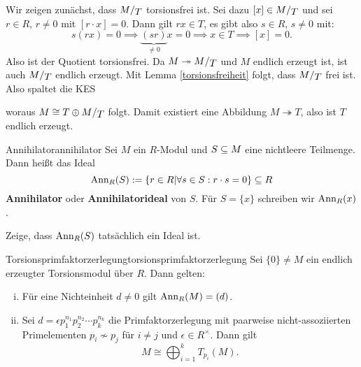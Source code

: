 \begin{beweis}
Wir zeigen zunächst, dass $\quotient{M}{T}$ torsionsfrei ist. Sei dazu $[x]\in \quotient{M}{T}$ und sei $r \in R$, $r \neq 0$ mit $[r \cdot x ] = 0$. Dann gilt $rx \in T$, es gibt also $s \in R$, $s \neq 0$ mit:
\begin{equation}
s(rx) = 0 \implies \underbrace{(sr)}_{\neq 0} x = 0 \implies x \in T \implies [x]=0.
\end{equation}
Also ist der Quotient torsionsfrei. Da $M \twoheadrightarrow \quotient{M}{T}$ und $M$ endlich erzeugt ist, ist auch $\quotient{M}{T}$ endlich erzeugt. Mit Lemma \ref{torsionsfreiheit} folgt, dass $\quotient{M}{T}$ frei ist. Also spaltet die KES
\begin{center}
\end{center}
woraus $M \cong T \oplus \quotient{M}{T}$ folgt. Damit existiert eine Abbildung $M \twoheadrightarrow T$, also ist $T$ endlich erzeugt. 
\end{beweis}
\begin{definition}{Annihilator}{annihilator}
Sei $M$ ein $R$-Modul und $S \subseteq M$ eine nichtleere Teilmenge. Dann heißt das Ideal
\begin{equation}
\operatorname{\text{Ann}}_R(S):=\{r \in R| \forall s \in S:r \cdot s =0\} \subseteq R
\end{equation}
\textbf{Annihilator} oder \textbf{Annihilatorideal} von $S$. Für $S=\{x\}$ schreiben wir $\operatorname{\text{Ann}}_R(x)$.
\end{definition}
\begin{übung}
Zeige, dass $\operatorname{\text{Ann}}_R(S)$ tatsächlich ein Ideal ist.
\end{übung}
\begin{satz}{Torsionsprimfaktorzerlegung}{torsionsprimfaktorzerlegung}
Sei $\{0\} \neq M$ ein endlich erzeugter Torsionsmodul über $R$. Dann gelten:
\begin{enumerate}[(i)]
\item Für eine Nichteinheit $d \neq 0$ gilt $\operatorname{\text{Ann}}_R(M)=(d)$.
\item Sei $d = \epsilon p_1^{n_1}p_2^{n_2} \cdots p_k^{n_k}$ die Primfaktorzerlegung mit paarweise nicht-assoziierten Primelementen $p_i \nsim p_j$ für $i \neq j$ und $\epsilon \in R^\times$. Dann gilt
\begin{equation}
M \cong \bigoplus_{i=1}^k T_{p_i}(M).
\end{equation}
\end{enumerate}
\end{satz}
